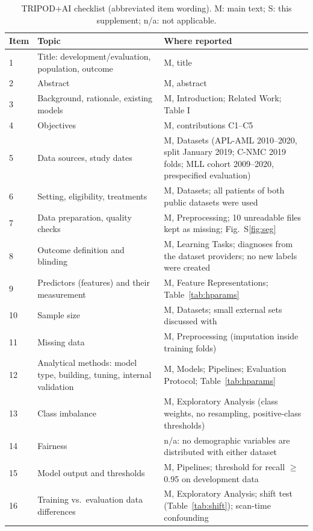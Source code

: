 \begin{table}[!htbp]
\centering
\caption{TRIPOD+AI checklist \cite{collins2024tripodai} (abbreviated item wording). M: main text; S: this supplement; n/a: not applicable.}
\label{tab:tripod}
\footnotesize
\setlength{\tabcolsep}{4pt}
\begin{tabular}{p{0.6cm}p{6.6cm}p{8.6cm}}
\toprule
Item & Topic & Where reported \\
\midrule
1 & Title: development/evaluation, population, outcome & M, title \\
2 & Abstract & M, abstract \\
3 & Background, rationale, existing models & M, Introduction; Related Work; Table I \\
4 & Objectives & M, contributions C1--C5 \\
5 & Data sources, study dates & M, Datasets (APL-AML 2010--2020, split January 2019; C-NMC 2019 folds; MLL cohort 2009--2020, prespecified evaluation) \\
6 & Setting, eligibility, treatments & M, Datasets; all patients of both public datasets were used \\
7 & Data preparation, quality checks & M, Preprocessing; 10 unreadable files kept as missing; Fig.~S\ref{fig:seg} \\
8 & Outcome definition and blinding & M, Learning Tasks; diagnoses from the dataset providers; no new labels were created \\
9 & Predictors (features) and their measurement & M, Feature Representations; Table~\ref{tab:hparams} \\
10 & Sample size & M, Datasets; small external sets discussed with \cite{riley2021samplesize,collins2016samplesize} \\
11 & Missing data & M, Preprocessing (imputation inside training folds) \\
12 & Analytical methods: model type, building, tuning, internal validation & M, Models; Pipelines; Evaluation Protocol; Table~\ref{tab:hparams} \\
13 & Class imbalance & M, Exploratory Analysis (class weights, no resampling, positive-class thresholds) \\
14 & Fairness & n/a: no demographic variables are distributed with either dataset \\
15 & Model output and thresholds & M, Pipelines; threshold for recall $\geq$0.95 on development data \\
16 & Training vs.\ evaluation data differences & M, Exploratory Analysis; shift test (Table~\ref{tab:shift}); scan-time confounding \\

\end{tabular}
\end{table}
